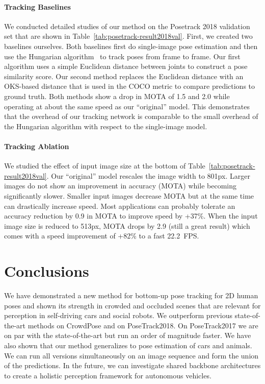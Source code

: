 \documentclass[journal]{IEEEtran}
\begin{document}
\paragraph{Tracking Baselines}

We conducted detailed studies of our method on the Posetrack 2018 validation set that are
shown in Table~\ref{tab:posetrack-result2018val}.
First, we created two baselines ourselves. Both baselines first do single-image
pose estimation and then use the Hungarian algorithm~\cite{kuhn1955hungarian} to track poses
from frame to frame. Our first algorithm uses a simple Euclidean distance
between joints to construct a pose similarity score. Our second method
replaces the Euclidean distance with an OKS-based distance that is used in the COCO metric to compare predictions to ground truth. Both methods show a drop in MOTA of 1.5 and 2.0 while operating at about the same speed as our ``original'' model.
This demonstrates that the overhead of our tracking network
is comparable to the small overhead of the Hungarian algorithm with
respect to the single-image model.


\paragraph{Tracking Ablation}

We studied the effect of input image size at the bottom
of Table~\ref{tab:posetrack-result2018val}.
Our ``original'' model rescales the image width to 801px.
Larger images do not show an improvement in accuracy (MOTA) while
becoming significantly slower. Smaller input images
decrease MOTA but at the same time can drastically increase
speed. Most applications can probably tolerate an accuracy
reduction by 0.9 in MOTA to improve speed by +37\%. When the
input image size is reduced to 513px, MOTA drops by 2.9 (still a
great result) which comes with a speed improvement of +82\% to
a fast 22.2~FPS.









\section{Conclusions}


We have demonstrated a new method for bottom-up pose tracking for 2D human poses
and shown its strength in crowded and occluded scenes that are relevant for
perception in self-driving cars and social robots. We outperform previous
state-of-the-art methods on CrowdPose and on PoseTrack2018. On PoseTrack2017
we are on par with the state-of-the-art but run an order of magnitude faster.
We have also
shown that our method generalizes to pose estimation of cars and animals.
We can run all versions simultaneously on an image sequence and form the union of the predictions. In the future, we can investigate shared backbone
architectures
to create a holistic perception framework for autonomous vehicles.
\end{document}

